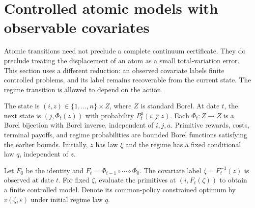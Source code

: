 \section{Controlled atomic models with observable covariates}\label{sec:controlled-fibers}
Atomic transitions need not preclude a complete continuum certificate. They do preclude treating the displacement of an atom as a small total-variation error. This section uses a different reduction: an observed covariate labels finite controlled problems, and its label remains recoverable from the current state. The regime transition is allowed to depend on the action.

\begin{assumption}\label{ass:fibers}
The state is $(i,z)\in\{1,\ldots,n\}\times Z$, where $Z$ is standard Borel. At date $t$, the next state is $(j,\Phi_t(z))$ with probability $P_t^a(i,j;z)$. Each $\Phi_t:Z\to Z$ is a Borel bijection with Borel inverse, independent of $i,j,a$. Primitive rewards, costs, terminal payoffs, and regime probabilities are bounded Borel functions satisfying the earlier bounds. Initially, $z$ has law $\xi$ and the regime has a fixed conditional law $q$, independent of $z$.
\end{assumption}

Let $F_0$ be the identity and $F_t=\Phi_{t-1}\circ\cdots\circ\Phi_0$. The covariate label $\zeta=F_t^{-1}(z)$ is observed at date $t$. For fixed $\zeta$, evaluate the primitives at $(i,F_t(\zeta))$ to obtain a finite controlled model. Denote its common-policy constrained optimum by $v(\zeta,\varepsilon)$ under initial regime law $q$.

